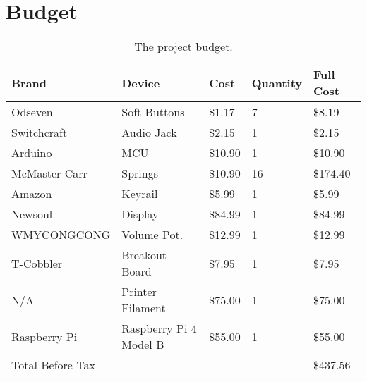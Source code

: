 \section{Budget}
\begin{table}[h!]
  \centering
  \begin{tabular}{|l|l|l|l|l|}
    \hline
    Brand            & Device                 & Cost    & Quantity & Full Cost \\ \hline
    Odseven          & Soft Buttons           & \$1.17  & 7        & \$8.19    \\ \hline
    Switchcraft      & Audio Jack             & \$2.15  & 1        & \$2.15    \\ \hline
    Arduino          & MCU                    & \$10.90 & 1        & \$10.90   \\ \hline
    McMaster-Carr    & Springs                & \$10.90 & 16       & \$174.40  \\ \hline
    Amazon           & Keyrail                & \$5.99  & 1        & \$5.99    \\ \hline
    Newsoul          & Display                & \$84.99 & 1        & \$84.99   \\ \hline
    WMYCONGCONG      & Volume Pot.            & \$12.99 & 1        & \$12.99   \\ \hline
    T-Cobbler        & Breakout Board         & \$7.95  & 1        & \$7.95    \\ \hline
    N/A              & Printer Filament       & \$75.00 & 1        & \$75.00   \\ \hline
    Raspberry Pi     & Raspberry Pi 4 Model B & \$55.00 & 1        & \$55.00   \\ \hline
    Total Before Tax &                        &         &          & \$437.56  \\ \hline
  \end{tabular}
  \caption{The project budget.}
  \label{Tab:budget}
\end{table}
